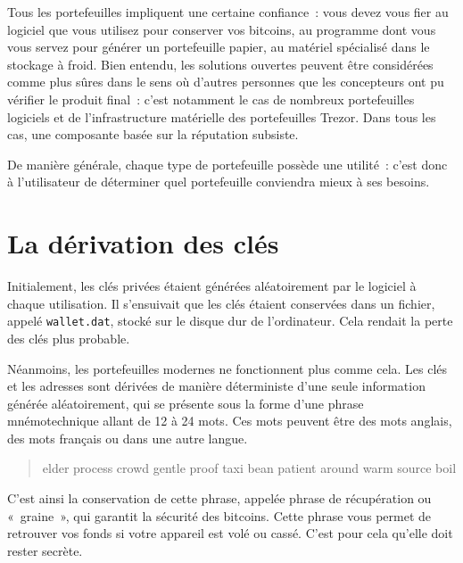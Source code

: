 Tous les portefeuilles impliquent une certaine confiance~: vous devez vous fier au logiciel que vous utilisez pour conserver vos bitcoins, au programme dont vous vous servez pour générer un portefeuille papier, au matériel spécialisé dans le stockage à froid. Bien entendu, les solutions ouvertes peuvent être considérées comme plus sûres dans le sens où d'autres personnes que les concepteurs ont pu vérifier le produit final~: c'est notamment le cas de nombreux portefeuilles logiciels et de l'infrastructure matérielle des portefeuilles Trezor. Dans tous les cas, une composante basée sur la réputation subsiste.

De manière générale, chaque type de portefeuille possède une utilité~: c'est donc à l'utilisateur de déterminer quel portefeuille conviendra mieux à ses besoins.

\section*{La dérivation des clés}


Initialement, les clés privées étaient générées aléatoirement par le logiciel à chaque utilisation. Il s'ensuivait que les clés étaient conservées dans un fichier, appelé \texttt{wallet.dat}, stocké sur le disque dur de l'ordinateur. Cela rendait la perte des clés plus probable.

Néanmoins, les portefeuilles modernes ne fonctionnent plus comme cela. Les clés et les adresses sont dérivées de manière déterministe d'une seule information générée aléatoirement, qui se présente sous la forme d'une phrase mnémotechnique allant de 12 à 24 mots. Ces mots peuvent être des mots anglais, des mots français ou dans une autre langue.


\begin{quote}
elder process crowd gentle proof taxi bean patient around warm source boil
\end{quote}

C'est ainsi la conservation de cette phrase, appelée phrase de récupération ou «~graine~», qui garantit la sécurité des bitcoins. Cette phrase vous permet de retrouver vos fonds si votre appareil est volé ou cassé. C'est pour cela qu'elle doit rester secrète.

